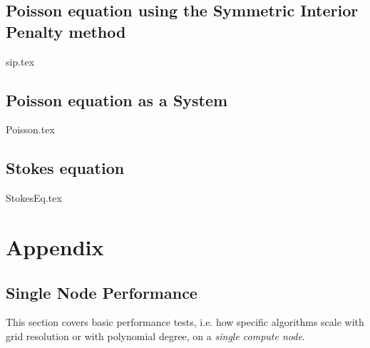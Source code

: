 \documentclass[a4paper,10pt]{report} %
\begin{document}
\chapter{Poisson equation using the Symmetric Interior Penalty method}
\label{sec:SIP}
{sip.tex}

\chapter{Poisson equation as a System}
\label{sec:PoissonAsASystem}
{Poisson.tex}

\chapter{Stokes equation}
\label{sec:Stokes}
{StokesEq.tex}



\part{Appendix}
\appendix

\chapter{Single Node Performance}
\label{sec:SingleNodePerformance}
This section covers basic performance tests, i.e. how specific algorithms scale 
with grid resolution or with polynomial degree, on a \emph{single compute node}.
\end{document}
